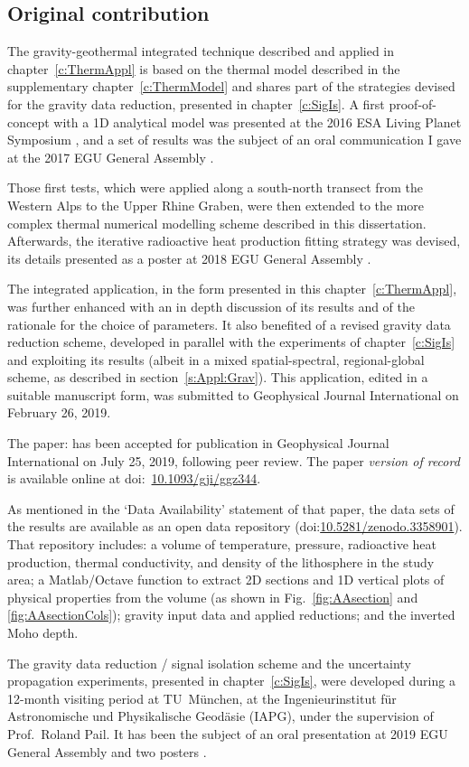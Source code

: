 \subsection*{Original contribution}
The gravity-geothermal integrated technique described and applied in chapter~\ref{c:ThermAppl} is based on the thermal model described in the supplementary chapter~\ref{c:ThermModel} and shares part of the strategies devised for the gravity data reduction, presented in chapter~\ref{c:SigIs}.
A first proof-of-concept with a 1D analytical model was presented at the 2016 ESA Living Planet Symposium \parencite{Pastorutti2016LPS}, and a set of results was the subject of an oral communication I gave at the 2017 EGU General Assembly \parencite{Pastorutti2017_EGUoral}.

Those first tests, which were applied along a south-north transect from the Western Alps to the Upper Rhine Graben, were then extended to the more complex thermal numerical modelling scheme described in this dissertation.
Afterwards, the iterative radioactive heat production fitting strategy was devised, its details presented as a poster at 2018 EGU General Assembly \parencite{Pastorutti2018_EGUposter}.

The integrated application, in the form presented in this chapter~\ref{c:ThermAppl}, was further enhanced with an in depth discussion of its results and of the rationale for the choice of parameters.
It also benefited of a revised gravity data reduction scheme, developed in parallel with the experiments of chapter~\ref{c:SigIs} and exploiting its results (albeit in a mixed spatial-spectral, regional-global scheme, as described in section~\ref{s:Appl:Grav}).
This application, edited in a suitable manuscript form, was submitted to Geophysical Journal International on February 26, 2019.

The paper:  \parencite{Pastorutti2019} has been accepted for publication in Geophysical Journal International on July 25, 2019, following peer review.
The paper \textit{version of record} is available online at doi:~\href{https://doi.org/10.1093/gji/ggz344}{10.1093/gji/ggz344}.

As mentioned in the `Data Availability' statement of that paper, the data sets of the results are available as an open data repository (doi:\href{https://doi.org/10.5281/zenodo.3358901}{10.5281/zenodo.3358901}).
That repository includes: a volume of temperature, pressure, radioactive heat production, thermal conductivity, and density of the lithosphere in the study area; a Matlab/Octave function to extract 2D sections and 1D vertical plots of physical properties from the volume (as shown in Fig.~\ref{fig:AAsection} and \ref{fig:AAsectionCols}); gravity input data and applied reductions; and the inverted Moho depth.

The gravity data reduction / signal isolation scheme and the uncertainty propagation experiments, presented in chapter~\ref{c:SigIs}, were developed during a 12-month visiting period at TU~München, at the Ingenieurinstitut für Astronomische und Physikalische Geodäsie (IAPG), under the supervision of Prof.~Roland Pail.
It has been the subject of an oral presentation at 2019 EGU General Assembly \parencite{Pastorutti2019EGU} and two posters \parencites{Pastorutti2019LPS}{Pastorutti2019IUGG}.

